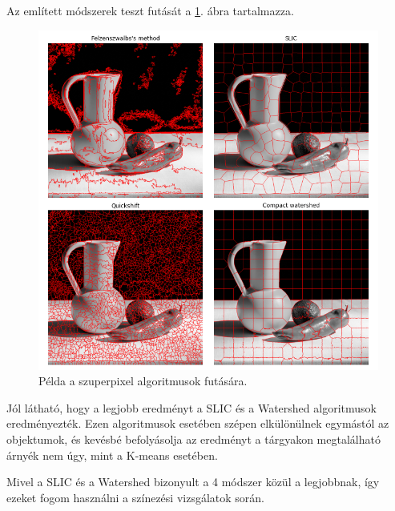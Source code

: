 
Az említett módszerek teszt futását a \ref{fig:superpixel_example}. ábra tartalmazza.

\begin{figure}[h]
\centering
\includegraphics[scale=0.6]{images/superpixel_example.png}
\caption{Példa a szuperpixel algoritmusok futására. }
\label{fig:superpixel_example}
\end{figure}

Jól látható, hogy a legjobb eredményt a SLIC és a Watershed algoritmusok eredményezték. Ezen algoritmusok esetében szépen elkülönülnek egymástól az objektumok, és kevésbé befolyásolja az eredményt a tárgyakon megtalálható árnyék nem úgy, mint a K-means esetében.

Mivel a SLIC és a Watershed bizonyult a 4 módszer közül a legjobbnak, így ezeket fogom használni a színezési vizsgálatok során.
